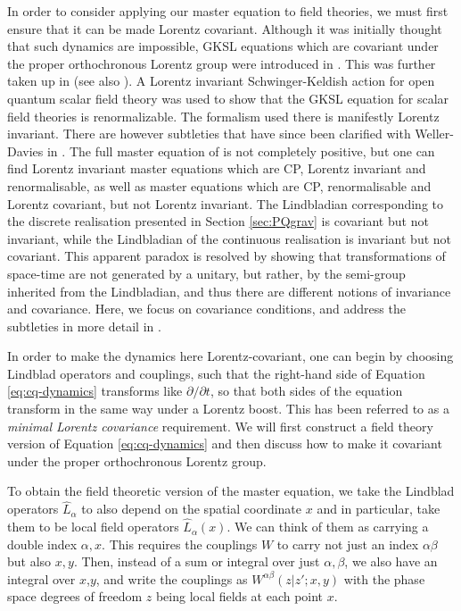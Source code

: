 \documentclass[aps,pra,showpacs,citeautoscript,amsmath,amssymb,floatfix,superscriptaddress,bbm, verbatim,amsfonts,changes,12pt,nofootinbib,longbibliography]{revtex4-2}
\def\z{{z}}
\def\L{{\hat{L}}}
\def\rate{{W}}
\def\ab{^{\alpha\beta}}
\def\rateabx{{\rate\ab(\z|\z';x,y)}}
\begin{document}
In order to consider applying our master equation to field theories, we must first ensure that it can be made Lorentz covariant.
Although it was initially thought that such dynamics are impossible\cite{srednicki-purity}, GKSL equations which are covariant under the proper orthochronous Lorentz group were introduced in \cite{alicki-reldecoherence}. This was further taken up in \cite{poulinKITP,OR-intrinsic} (see also \cite{beckman2001causal}).  A Lorentz invariant Schwinger-Keldish action for open quantum scalar field theory was used to show that the GKSL equation for scalar field theories is renormalizable\cite{baidya2017renormalization}. The formalism used there is manifestly Lorentz invariant. There are however subtleties that have since been clarified with Weller-Davies in \cite{UCLLorentz}. The full master equation of \cite{baidya2017renormalization} is not completely positive, but one can find Lorentz invariant master equations which are CP, Lorentz invariant and renormalisable, as well as master equations which are CP, renormalisable and Lorentz covariant, but not Lorentz invariant. The Lindbladian corresponding to the discrete realisation presented in Section \ref{sec:PQgrav} is covariant but not invariant, while the Lindbladian of the continuous realisation is invariant but not covariant. This apparent paradox is resolved by showing that transformations of space-time are not generated by a unitary, but rather, by the semi-group inherited from the Lindbladian, and thus there are different notions of invariance and covariance\cite{UCLLorentz}. Here, we focus on covariance conditions, and address the subtleties in more detail in \cite{UCLLorentz,oppenheim2023covariant}\label{ft:renorm}. 


In order to make the dynamics here Lorentz-covariant, one can begin by choosing Lindblad operators and couplings, such that the right-hand side of Equation \eqref{eq:cq-dynamics} transforms like $\partial/\partial t$, so that both sides of the equation transform
in the same way under a Lorentz boost.  This has been referred to as a {\it minimal Lorentz covariance} requirement\cite{srednicki-purity}.
We will first construct a field theory version of Equation \eqref{eq:cq-dynamics} and then discuss how to make it covariant under the proper orthochronous Lorentz group. 


To obtain the field theoretic version of the master equation, we take the Lindblad operators $\L_{\alpha}$ to also depend on the spatial coordinate $x$ and in particular, take them to be local field operators  $\L_{\alpha}(x)$. We can think of them as carrying a double index $\alpha,x$. This requires the couplings $\rate$ to carry not just an index $\alpha\beta$ but also $x,y$.
Then, instead of a sum or integral over just $\alpha,\beta$, we also have an integral over $x$,$y$, and write the couplings as $\rateabx$ with the phase space degrees of freedom $\z$ being local fields at each point $x$.
\end{document}
